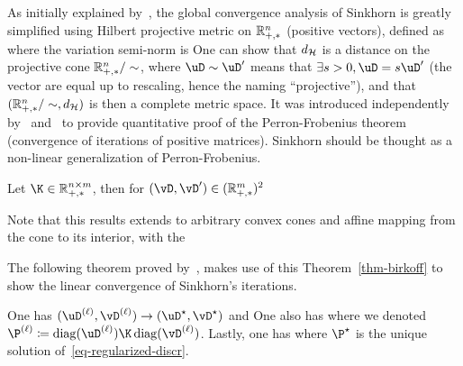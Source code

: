 As initially explained by~\cite{franklin1989scaling}, the global convergence analysis of Sinkhorn is greatly simplified using Hilbert projective metric on $\mathbb{R}_{+,*}^n$ (positive vectors), defined as
where the variation semi-norm is
One can show that $d_{\mathcal{H}}$ is a distance on the projective cone $\mathbb{R}_{+,*}^n/\sim$, where $\uD \sim \uD'$ means that $\exists s>0, \uD=s\uD'$ (the vector are equal up to rescaling, hence the naming ``projective''), and that $(\mathbb{R}_{+,*}^n/\sim,d_{\mathcal{H}})$ is then a complete metric space.  
%
It was introduced independently by~\cite{birkhoff1957extensions} and~\cite{samelson1957perron} to provide quantitative proof of the Perron-Frobenius theorem (convergence of iterations of positive matrices). Sinkhorn should be thought as a non-linear generalization of Perron-Frobenius. 


\begin{thm}\label{thm-birkoff}
	Let $\K \in \RR_{+,*}^{n \times m}$, then for $(\vD,\vD') \in (\RR_{+,*}^m)^2$
\end{thm}

Note that this results extends to arbitrary convex cones and affine mapping from the cone to its interior, with the 

The following theorem proved by~\cite{franklin1989scaling}, makes use of this Theorem~\ref{thm-birkoff} to show the linear convergence of Sinkhorn's iterations.

\begin{thm}
	One has $(\it{\uD},\it{\vD}) \rightarrow (\uD^\star,\vD^\star)$ and
	One also has
	where we denoted $\it{\P} \eqdef \diag(\it{\uD}) \K \diag(\it{\vD})$. Lastly, one has
	\eql{\label{eq-convlin-sinkh-prim}
		\|\log(\it{\P}) - \log(\P^\star)\|_\infty \leq \Hilbert(\it{\uD}, \uD^\star) + \Hilbert(\it{\vD}, \vD^\star)
	}
	where $\P^\star$ is the unique solution of~\eqref{eq-regularized-discr}. 
\end{thm}

